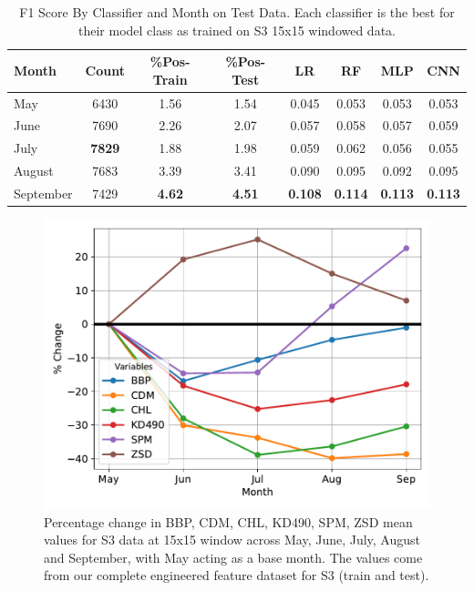 \documentclass[a4paper,11pt]{report}
\begin{document}
    \begin{table}[H]
        \caption{F1 Score By Classifier and Month on Test Data. Each classifier is the best for their model class as trained on S3 15x15 windowed data.}
        \label{tab:metrics_across_months}
        \centering
        \begin{tabular}{lccccccc}
        \toprule
        \textbf{Month} & \textbf{Count} & \textbf{\%Pos-Train} & \textbf{\%Pos-Test} & \textbf{LR} & \textbf{RF} & \textbf{MLP} & \textbf{CNN} \\
        \midrule
        May & 6430 & 1.56 & 1.54 & 0.045 & 0.053 & 0.053 & 0.053 \\
        June & 7690 & 2.26 & 2.07 & 0.057 & 0.058 & 0.057 & 0.059  \\ 
        July & \textbf{7829} & 1.88 & 1.98 & 0.059 & 0.062 & 0.056 & 0.055 \\ 
        August & 7683 & 3.39 & 3.41 & 0.090 & 0.095& 0.092 & 0.095 \\
        September & 7429 & \textbf{4.62} & \textbf{4.51} & \textbf{0.108} & \textbf{0.114} & \textbf{0.113} & \textbf{0.113} \\\bottomrule
        \end{tabular}
    \end{table}


\begin{figure}[H]
    
        \centering
        \includegraphics[height=0.2\textheight]{images/percent_change_by_month.pdf}
        \caption{Percentage change in BBP, CDM, CHL, KD490, SPM, ZSD mean values for S3 data at 15x15 window across May, June, July, August and September, with May acting as a base month. The values come from our complete engineered feature dataset for S3 (train and test).}
        \label{fig:pc_by_month}
\end{figure}
\end{document}
